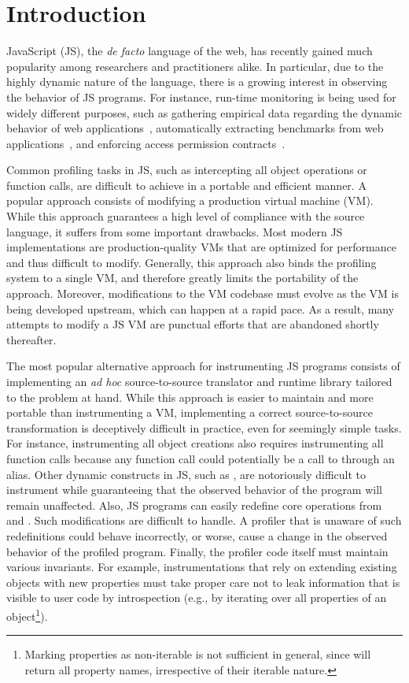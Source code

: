 \chapter{Introduction}

JavaScript (JS), the \emph{de facto} language of the web, has recently gained much
popularity among researchers and practitioners alike. In particular, due to the
highly dynamic nature of the language, there is a growing interest in observing
the behavior of JS programs. For instance, run-time monitoring is being used for
widely different purposes, such as gathering empirical data regarding the
dynamic behavior of web applications~\cite{behavior_js}, automatically
extracting benchmarks from web applications~\cite{Richards:2011}, and enforcing
access permission contracts~\cite{Heidegger:2012}.

Common profiling tasks in JS, such as intercepting all object operations or
function calls, are difficult to achieve in a portable and efficient
manner. A popular approach consists of modifying a production virtual machine
(VM). While this approach guarantees a high level of compliance with the source
language, it suffers from some important drawbacks. Most modern JS
implementations are production-quality VMs that are optimized for performance
and thus difficult to modify. Generally, this approach also binds the profiling
system to a single VM, and therefore greatly limits the portability of the
approach. Moreover, modifications to the VM codebase must evolve as the VM is
being developed upstream, which can happen at a rapid pace. As a result,
many attempts to modify a JS VM are punctual efforts that are abandoned shortly
thereafter. 

The most popular alternative approach for instrumenting JS programs consists of
implementing an \textit{ad hoc} source-to-source translator and runtime
library tailored to the problem at hand. While this approach is easier to maintain and
more portable than instrumenting a VM, implementing a correct source-to-source
transformation is deceptively difficult in practice, even for seemingly simple
tasks. For instance, instrumenting all object creations also requires
instrumenting all function calls because any function call could potentially be
a call to  through an alias. Other dynamic constructs in JS,
such as , are notoriously difficult to instrument while guaranteeing
that the observed behavior of the program will remain unaffected. Also, JS
programs can easily redefine core operations from  and .
Such modifications are difficult to handle. A profiler that is unaware of such
redefinitions could behave incorrectly, or worse, cause a change in the
observed behavior of the profiled program. Finally, the profiler code itself
must maintain various invariants. For example, instrumentations that rely on
extending existing objects with new properties must take proper care not to
leak information that is visible to user code by introspection (e.g., by
iterating over all properties of an object\footnote{Marking properties as
non-iterable is not sufficient in general, since
 will return all property names, irrespective of
their iterable nature.}).

